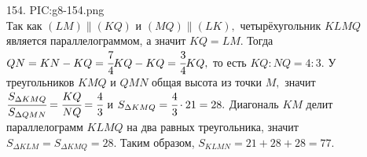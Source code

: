 154. {{PIC:g8-154.png}}\\
Так как $(LM)\parallel (KQ)$ и $(MQ)\parallel(LK),$ четырёхугольник $KLMQ$ является параллелограммом, а значит $KQ=LM.$ Тогда $QN=KN-KQ=\cfrac{7}{4}KQ-KQ=\cfrac{3}{4}KQ,$ то есть $KQ:NQ=4:3.$ У треугольников $KMQ$ и $QMN$ общая высота из точки $M,$ значит $\cfrac{S_{\Delta KMQ}}{S_{\Delta QMN}}=\cfrac{KQ}{NQ}=\cfrac{4}{3}$ и $S_{\Delta KMQ}=\cfrac{4}{3}\cdot21=28.$ Диагональ $KM$ делит параллелограмм $KLMQ$ на два равных треугольника, значит $S_{\Delta KLM}=S_{\Delta KMQ}=28.$ Таким образом, $S_{KLMN}=21+28+28=77.$\\
